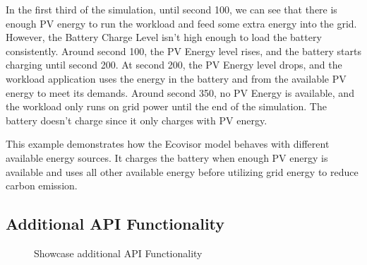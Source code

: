 In the first third of the simulation, until second 100, we can see that there is enough PV energy to run the workload and feed some extra energy into the grid. However, the Battery Charge Level isn't high enough to load the battery consistently. Around second 100, the PV Energy level rises, and the battery starts charging until second 200. At second 200, the PV Energy level drops, and the workload application uses the energy in the battery and from the available PV energy to meet its demands. Around second 350, no PV Energy is available, and the workload only runs on grid power until the end of the simulation. The battery doesn't charge since it only charges with PV energy.

This example demonstrates how the Ecovisor model behaves with different available energy sources. It charges the battery when enough PV energy is available and uses all other available energy before utilizing grid energy to reduce carbon emission.


\subsection{Additional API Functionality}

\begin{figure*}
	\centering
	\caption{Showcase additional API Functionality}
	\label{fig:example_case_b}
\end{figure*}

